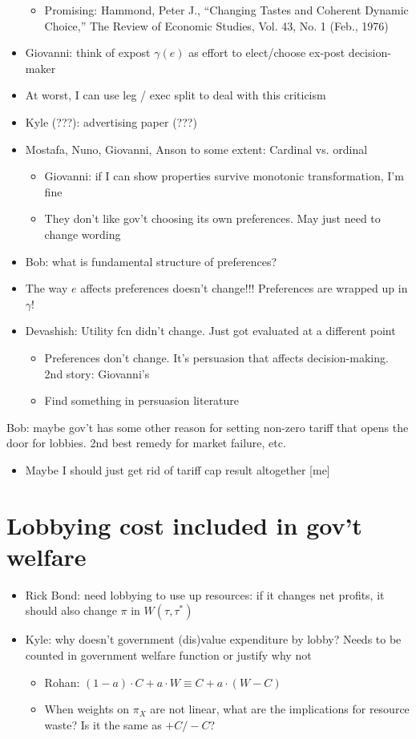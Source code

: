 \documentclass[12pt]{article}
\newcommand{\ga}{\gamma}
\begin{document}
\begin{itemize}
\begin{itemize}
					\item Promising: Hammond, Peter J., ``Changing Tastes and Coherent Dynamic Choice,'' The Review of Economic Studies, Vol. 43, No. 1 (Feb., 1976)
				\end{itemize}
			\item Giovanni: think of expost $\ga(e)$ as effort to elect/choose ex-post decision-maker
			\item At worst, I can use leg / exec split to deal with this criticism
			\item Kyle (???): advertising paper (???)
			\item Mostafa, Nuno, Giovanni, Anson to some extent: Cardinal vs. ordinal
				\begin{itemize}
					\item Giovanni: if I can show properties survive  monotonic transformation, I'm fine
					\item They don't like gov't choosing its own preferences. May just need to change wording
				\end{itemize}
			\item Bob: what is fundamental structure of preferences?
			\item The way $e$ affects preferences doesn't change!!! Preferences are wrapped up in $\ga$!
			\item Devashish: Utility fcn didn't change. Just got evaluated at a different point
				\begin{itemize}
					\item Preferences don't change. It's persuasion that affects decision-making. 2nd story: Giovanni's
					\item Find something in persuasion literature
				\end{itemize}
		\end{itemize}
	Bob: maybe gov't has some other reason for setting non-zero tariff that opens the door for lobbies. 2nd best remedy for market failure, etc.
	\begin{itemize}
			\item Maybe I should just get rid of tariff cap result altogether [me]
		\end{itemize}
		

\section{Lobbying cost included in gov't welfare}
	\begin{itemize}
		\item Rick Bond: need lobbying to use up resources: if it changes net profits, it should also change $\pi$ in $W(\tau,\tau^*)$
		\item Kyle: why doesn't government (dis)value expenditure by lobby? Needs to be counted in government welfare function or justify why not
		\begin{itemize}
			\item Rohan: $(1-a)\cdot C + a \cdot W \equiv C + a \cdot (W-C)$
			\item When weights on $\pi_X$ are not linear, what are the implications for resource waste? Is it the same as $+ C / - C$?
		\end{itemize}
	\end{itemize}
\end{document}

